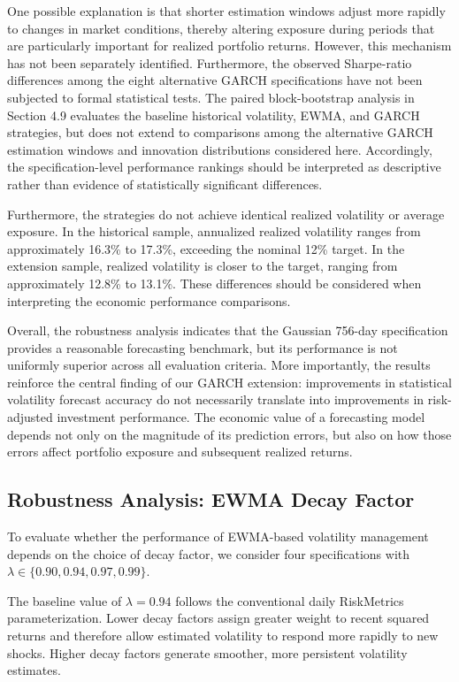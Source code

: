\documentclass[11pt]{article}
\begin{document}
One possible explanation is that shorter estimation windows adjust more rapidly to changes in market conditions, thereby altering exposure during periods that are particularly important for realized portfolio returns. However, this mechanism has not been separately identified. Furthermore, the observed Sharpe-ratio differences among the eight alternative GARCH specifications have not been subjected to formal statistical tests. The paired block-bootstrap analysis in Section 4.9 evaluates the baseline historical volatility, EWMA, and GARCH strategies, but does not extend to comparisons among the alternative GARCH estimation windows and innovation distributions considered here. Accordingly, the specification-level performance rankings should be interpreted as descriptive rather than evidence of statistically significant differences.

Furthermore, the strategies do not achieve identical realized
volatility or average exposure. In the historical sample,
annualized realized volatility ranges from approximately 16.3\%
to 17.3\%, exceeding the nominal 12\% target. In the extension
sample, realized volatility is closer to the target, ranging
from approximately 12.8\% to 13.1\%. These differences should
be considered when interpreting the economic performance
comparisons.


Overall, the robustness analysis indicates that
the Gaussian 756-day specification provides a
reasonable forecasting benchmark, but its
performance is not uniformly superior across
all evaluation criteria. More importantly,
the results reinforce the central finding of
our GARCH extension: improvements in statistical
volatility forecast accuracy do not necessarily
translate into improvements in risk-adjusted
investment performance. The economic value of
a forecasting model depends not only on the
magnitude of its prediction errors, but also
on how those errors affect portfolio exposure
and subsequent realized returns.



\subsection{Robustness Analysis: EWMA Decay Factor}

To evaluate whether the performance of EWMA-based
volatility management depends on the choice of decay
factor, we consider four specifications with
$\lambda \in \{0.90, 0.94, 0.97, 0.99\}$.

The baseline value of $\lambda=0.94$ follows the
conventional daily RiskMetrics parameterization.
Lower decay factors assign greater weight to recent
squared returns and therefore allow estimated
volatility to respond more rapidly to new shocks.
Higher decay factors generate smoother, more
persistent volatility estimates.
\end{document}
